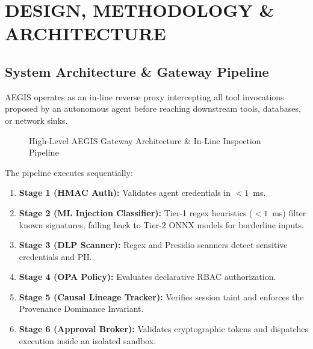 \chapter{DESIGN, METHODOLOGY \& ARCHITECTURE}

\section{System Architecture \& Gateway Pipeline}
AEGIS operates as an in-line reverse proxy intercepting all tool invocations proposed by an autonomous agent before reaching downstream tools, databases, or network sinks.

\begin{figure}[htbp]
\centering
{}
\caption{High-Level AEGIS Gateway Architecture \& In-Line Inspection Pipeline}
\label{fig:pipeline_arch}
\end{figure}

The pipeline executes sequentially:
\begin{enumerate}
    \item \textbf{Stage 1 (HMAC Auth):} Validates agent credentials in $<1$~ms.
    \item \textbf{Stage 2 (ML Injection Classifier):} Tier-1 regex heuristics ($<1$~ms) filter known signatures, falling back to Tier-2 ONNX models for borderline inputs.
    \item \textbf{Stage 3 (DLP Scanner):} Regex and Presidio scanners detect sensitive credentials and PII.
    \item \textbf{Stage 4 (OPA Policy):} Evaluates declarative RBAC authorization.
    \item \textbf{Stage 5 (Causal Lineage Tracker):} Verifies session taint and enforces the Provenance Dominance Invariant.
    \item \textbf{Stage 6 (Approval Broker):} Validates cryptographic tokens and dispatches execution inside an isolated sandbox.
\end{enumerate}


